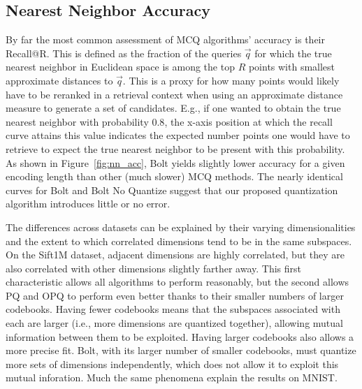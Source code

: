 




\subsection{Nearest Neighbor Accuracy}

By far the most common assessment of MCQ algorithms' accuracy is their Recall@R. This is defined as the fraction of the queries $\vec{q}$ for which the true nearest neighbor in Euclidean space is among the top $R$ points with smallest approximate distances to $\vec{q}$. This is a proxy for how many points would likely have to be reranked in a retrieval context when using an approximate distance measure to generate a set of candidates. E.g., if one wanted to obtain the true nearest neighbor with probability $0.8$, the x-axis position at which the recall curve attains this value indicates the expected number points one would have to retrieve to expect the true nearest neighbor to be present with this probability. As shown in Figure~\ref{fig:nn_acc}, Bolt yields slightly lower accuracy for a given encoding length than other (much slower) MCQ methods. The nearly identical curves for Bolt and Bolt No Quantize suggest that our proposed quantization algorithm introduces little or no error.

The differences across datasets can be explained by their varying dimensionalities and the extent to which correlated dimensions tend to be in the same subspaces. On the Sift1M dataset, adjacent dimensions are highly correlated, but they are also correlated with other dimensions slightly farther away. This first characteristic allows all algorithms to perform reasonably, but the second allows PQ and OPQ to perform even better thanks to their smaller numbers of larger codebooks. Having fewer codebooks means that the subspaces associated with each are larger (i.e., more dimensions are quantized together), allowing mutual information between them to be exploited. Having larger codebooks also allows a more precise fit. Bolt, with its larger number of smaller codebooks, must quantize more sets of dimensions independently, which does not allow it to exploit this mutual inforation. Much the same phenomena explain the results on MNIST.

